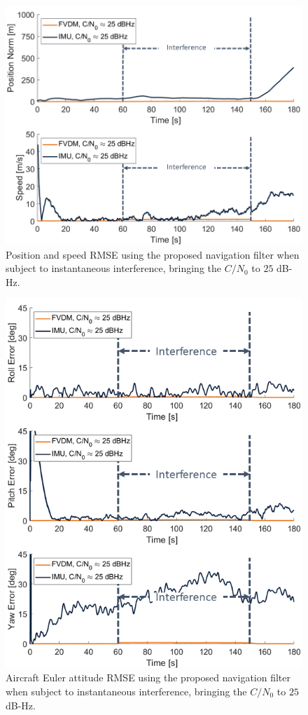 \documentclass[12pt]{report}
\begin{document}
\begin{figure}[!ht]
  \centering
  \includegraphics[width=0.75\linewidth]{Figures/Results/trajectoryfigure/Slide16.PNG}
  \caption{Position and speed RMSE using the proposed navigation filter when subject to instantaneous interference, bringing the \(C/N_0\) to \(25\) dB-Hz.}\label{fig:PosVel25}
\end{figure}


\begin{figure}[!ht]
  \centering
  \includegraphics[width=0.75\linewidth]{Figures/Results/trajectoryfigure/Slide4.PNG}
  \caption{Aircraft Euler attitude RMSE using the proposed navigation filter when subject to instantaneous interference, bringing the \(C/N_0\) to \(25\) dB-Hz.}\label{fig:Eul25}
\end{figure}
\end{document}
